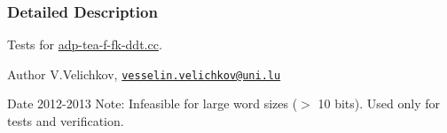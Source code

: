 \subsubsection{\-Detailed \-Description}
\-Tests for \hyperlink{adp-tea-f-fk-ddt_8cc}{adp-\/tea-\/f-\/fk-\/ddt.\-cc}. \begin{DoxyAuthor}{\-Author}
\-V.\-Velichkov, \href{mailto:vesselin.velichkov@uni.lu}{\tt vesselin.\-velichkov@uni.\-lu} 
\end{DoxyAuthor}
\begin{DoxyDate}{\-Date}
2012-\/2013 \-Note\-: \-Infeasible for large word sizes ($>$ 10 bits). \-Used only for tests and verification. 
\end{DoxyDate}
